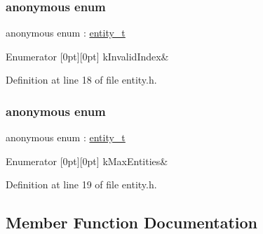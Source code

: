 \subsubsection{\texorpdfstring{anonymous enum}{anonymous enum}}
{\footnotesize\ttfamily anonymous enum \+: \mbox{\hyperlink{structnabla_1_1_entity_a0e7d5826cda759dfeb3a81c8175f3b4d}{entity\+\_\+t}}}

\begin{DoxyEnumFields}{Enumerator}
[0pt][0pt]{}\mbox{\label{structnabla_1_1_entity_af5d356291772b453f7788f76d3b6eda3a2dc217e059d1f8553805dfaae2db3051}} 
k\+Invalid\+Index&\\
\hline

\end{DoxyEnumFields}


Definition at line 18 of file entity.\+h.

\mbox{\label{structnabla_1_1_entity_adaba9a30fd5fdebbe2a7f02ebe218bd2}} 
\subsubsection{\texorpdfstring{anonymous enum}{anonymous enum}}
{\footnotesize\ttfamily anonymous enum \+: \mbox{\hyperlink{structnabla_1_1_entity_a0e7d5826cda759dfeb3a81c8175f3b4d}{entity\+\_\+t}}}

\begin{DoxyEnumFields}{Enumerator}
[0pt][0pt]{}\mbox{\label{structnabla_1_1_entity_adaba9a30fd5fdebbe2a7f02ebe218bd2a1a033d53efd50a9e1848472cb1d0a6e6}} 
k\+Max\+Entities&\\
\hline

\end{DoxyEnumFields}


Definition at line 19 of file entity.\+h.



\subsection{Member Function Documentation}
\mbox{\label{structnabla_1_1_entity_a35c224e7c7c7f35e71150cdc3184b356}} 

